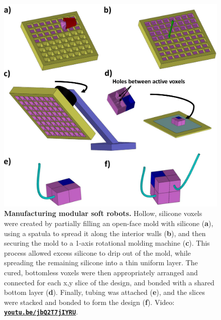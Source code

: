 
\begin{figure}[t]
    \centering
    \includegraphics[width=0.7\linewidth]{Chapter02/fig/voxel_manufacturing.jpg}
    \caption{\textbf{Manufacturing modular soft robots.}
    Hollow, silicone voxels were created by partially filling an open-face mold with silicone (\textbf{a}), 
    using a spatula to spread it along the interior walls (\textbf{b}), and then securing the mold to a 1-axis rotational molding machine (\textbf{c}). This process allowed excess silicone to drip out of the mold, while spreading the remaining silicone into a thin uniform layer.
    The cured, bottomless voxels were then appropriately arranged and connected for each x,y slice of the design, and bonded with a shared bottom layer (\textbf{d}).
    Finally, tubing was attached (\textbf{e}), and the slices were stacked and bonded to form the design (\textbf{f}). 
    Video:
\href{https://youtu.be/jbQ2T7jIYRU}{\color{blue}\tt\textbf{youtu.be/jbQ2T7jIYRU}}.
    }
    \label{fig:real}
\end{figure}
